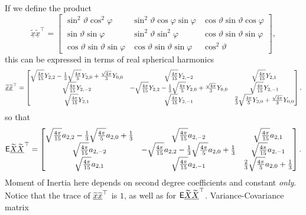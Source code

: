 \documentclass[preprint,11pt,a4paper]{elsarticle}
\begin{document}
If we define the product 
\begin{equation*}
\underline{\widetilde{x}}\underline{\widetilde{x}}^{\top}=%
\begin{bmatrix}
\sin^{2}\vartheta\cos^{2}\varphi & \sin^{2}\vartheta\cos\varphi\sin\varphi & 
\cos\vartheta\sin\vartheta\cos\varphi \\ 
\sin\vartheta\sin\varphi & \sin^{2}\vartheta\sin^{2}\varphi & \cos
\vartheta\sin\vartheta\sin\varphi \\ 
\cos\vartheta\sin\vartheta\sin\varphi & \cos\vartheta\sin\vartheta\sin\varphi
& \cos^{2}\vartheta%
\end{bmatrix}
,
\end{equation*}
this can be expressed in terms of real spherical harmonics 
\begin{equation}
\underline{\widetilde{x}}\underline{\widetilde{x}}^{\top}=%
\begin{bmatrix}
\sqrt{\frac{4\pi}{15}}Y_{2,2}-\frac{1}{3}\sqrt{\frac{4\pi}{5}}Y_{2,0}+\frac{%
\sqrt{4\pi}}{3}Y_{0,0} & \sqrt{\frac{4\pi}{15}}Y_{2,-2} & \sqrt {\frac{4\pi}{%
15}}Y_{2,1} \\ 
\sqrt{\frac{4\pi}{15}}Y_{2,-2} & -\sqrt{\frac{4\pi}{15}}Y_{2,2}-\frac{1}{3}%
\sqrt{\frac{4\pi}{5}}Y_{2,0}+\frac{\sqrt{4\pi}}{3}Y_{0,0} & \sqrt {\frac{4\pi%
}{15}}Y_{2,-1} \\ 
\sqrt{\frac{4\pi}{15}}Y_{2,1} & \sqrt{\frac{4\pi}{15}}Y_{2,-1} & \frac{2}{3}%
\sqrt{\frac{4\pi}{5}}Y_{2,0}+\frac{\sqrt{4\pi}}{3}Y_{0,0}%
\end{bmatrix}
,  \label{matrix_xx}
\end{equation}
so that%
\begin{equation*}
\mathsf{E}\widetilde{\underline{X}}\widetilde{\underline{X}}^{\top}=%
\begin{bmatrix}
\sqrt{\frac{4\pi}{15}}a_{2,2}-\frac{1}{3}\sqrt{\frac{4\pi}{5}}a_{2,0}+\frac {%
1}{3} & \sqrt{\frac{4\pi}{15}}a_{2,-2} & \sqrt{\frac{4\pi}{15}}a_{2,1} \\ 
\sqrt{\frac{4\pi}{15}}a_{2,-2} & -\sqrt{\frac{4\pi}{15}}a_{2,2}-\frac{1}{3}%
\sqrt{\frac{4\pi}{5}}a_{2,0}+\frac{1}{3} & \sqrt{\frac{4\pi}{15}}a_{2,-1} \\ 
\sqrt{\frac{4\pi}{15}}a_{2,1} & \sqrt{\frac{4\pi}{15}}a_{2,-1} & \frac{2}{3}%
\sqrt{\frac{4\pi}{5}}a_{2,0}+\frac{1}{3}%
\end{bmatrix}
.
\end{equation*}
Moment of Inertia here depends on second degree coefficients and constant 
\textit{only}. Notice that the trace of $\underline{\widetilde{x}}\underline{%
\widetilde{x}}^{\top}$ is $1$, as well as for $\mathsf{E}\widetilde{%
\underline{X}}\widetilde{\underline{X}}^{\top}$. Variance-Covariance matrix
\end{document}
